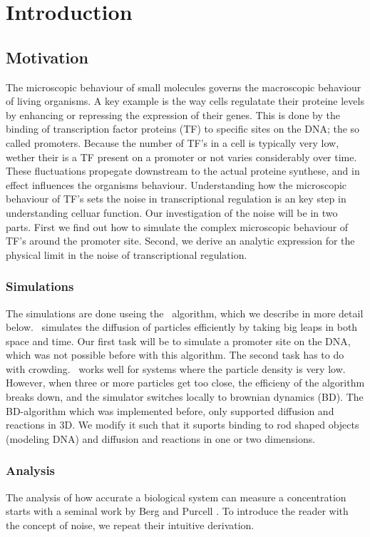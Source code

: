 \section{Introduction}

\subsection{Motivation}
The microscopic behaviour of small molecules governs the macroscopic behaviour of living organisms. A key example is the way cells regulatate their proteine levels by enhancing or repressing the expression of their genes. This is done by the binding of transcription factor proteins (TF) to specific sites on the DNA; the so called promoters. Because the number of TF's in a cell is typically very low, wether their is a TF present on a promoter or not varies considerably over time. These fluctuations propegate downstream to the actual proteine synthese, and in effect influences the organisms behaviour. Understanding how the microscopic behaviour of TF's sets the noise in transcriptional regulation is an key step in understanding celluar function. Our investigation of the noise will be in two parts. First we find out how to simulate the complex microscopic behaviour of TF's around the promoter site. Second, we derive an analytic expression for the physical limit in the noise of transcriptional regulation.

\subsubsection{Simulations}
The simulations are done useing the \GFRD\, algorithm, which we describe in more detail below. \GFRD\, simulates the diffusion of particles efficiently by taking big leaps in both space and time. Our first task will be to simulate a promoter site on the DNA, which was not possible before with this algorithm. The second task has to do with crowding. \GFRD\, works well for systems where the particle density is very low. However, when three or more particles get too close, the efficieny of the algorithm breaks down, and the simulator switches locally to brownian dynamics (BD). The BD-algorithm which was implemented before, only supported diffusion and reactions in 3D. We modify it such that it suports binding to rod shaped objects (modeling DNA) and diffusion and reactions in one or two dimensions.

\subsubsection{Analysis}
The analysis of how accurate a biological system can measure a concentration starts with a seminal work by Berg and Purcell \cite{Berg1977}. To introduce the reader with the concept of noise, we repeat their intuitive derivation. 

